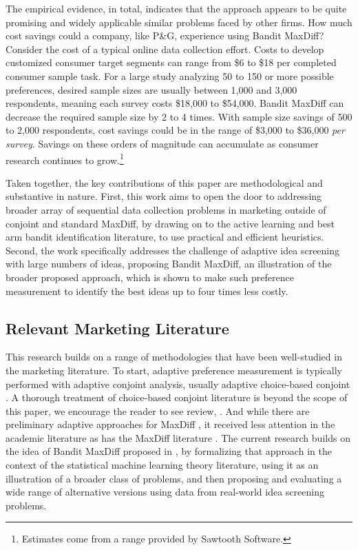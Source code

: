 \documentclass[blindrev]{informs3} %
\begin{document}
The empirical evidence, in total, indicates that the approach appears to be quite promising and widely applicable similar problems faced by other firms. How much cost savings could a company, like P\&G, experience using Bandit MaxDiff? Consider the cost of a typical online data collection effort. Costs to develop customized consumer target segments can range from \$6 to \$18 per completed consumer sample task. For a large study analyzing 50 to 150 or more possible preferences, desired sample sizes are usually between 1,000 and 3,000 respondents, meaning each survey costs \$18,000 to \$54,000. Bandit MaxDiff can decrease the required sample size by 2 to 4 times. With sample size savings of 500 to 2,000 respondents, cost savings could be in the range of \$3,000 to \$36,000 \emph{per survey}. Savings on these orders of magnitude can accumulate as consumer research continues to grow.\footnote{Estimates come from a range provided by Sawtooth Software.}

Taken together, the key contributions of this paper are methodological and substantive in nature. First, this work aims to open the door to addressing broader array of sequential data collection problems in marketing outside of conjoint and standard MaxDiff, by drawing on to the active learning and best arm bandit identification literature, to use practical and efficient heuristics. Second, the work specifically addresses the challenge of adaptive idea screening with large numbers of ideas, proposing Bandit MaxDiff, an illustration of the broader proposed approach, which is shown to make such preference measurement to identify the best ideas up to four times less costly.


\subsection{Relevant Marketing Literature}

This research builds on a range of methodologies that have been well-studied in the marketing literature. To start, adaptive preference measurement is typically performed with adaptive conjoint analysis, usually adaptive choice-based conjoint \citep{arora2001improving,toubia2003fast,toubia2004polyhedral}. A thorough treatment of choice-based conjoint literature is beyond the scope of this paper, we encourage the reader to see review, \cite{toubia2007chapter}. And while there are preliminary adaptive approaches for MaxDiff \citep{orme2006adaptive}, it received less attention in the academic literature as has the MaxDiff literature \citep{cohen2003maximum}. The current research builds on the idea of Bandit MaxDiff proposed in \cite{fairchildetal2015banditmaxdiff}, by formalizing that approach in the context of the statistical machine learning theory literature, using it as an illustration of a broader class of problems, and then proposing and evaluating a wide range of alternative versions using data from real-world idea screening problems.
\end{document}
